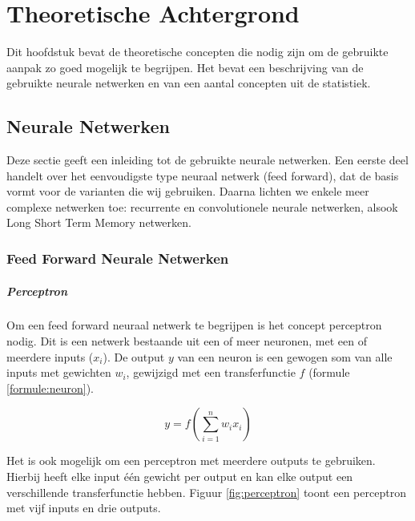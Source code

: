 \chapter{Theoretische Achtergrond}
\label{hst-theorie}
Dit hoofdstuk bevat de theoretische concepten die nodig zijn om de gebruikte aanpak zo goed mogelijk te begrijpen. Het bevat een beschrijving van de gebruikte neurale netwerken en van een aantal concepten uit de statistiek.

\section{Neurale Netwerken}
Deze sectie geeft een inleiding tot de gebruikte neurale netwerken. Een eerste deel handelt over het eenvoudigste type neuraal netwerk (feed forward), dat de basis vormt voor de varianten die wij gebruiken. Daarna lichten we enkele meer complexe netwerken toe: recurrente en convolutionele neurale netwerken, alsook Long Short Term Memory netwerken. 

\subsection{Feed Forward Neurale Netwerken}
\paragraph{Perceptron} %
\label{par:perceptron}

Om een feed forward neuraal netwerk te begrijpen is het concept perceptron nodig. Dit is een netwerk bestaande uit een of meer neuronen, met een of meerdere inputs ($x_i$). De output $y$ van een neuron is een gewogen som van alle inputs met gewichten $w_i$, gewijzigd met een transferfunctie $f$ (formule \ref{formule:neuron}).

\begin{equation}
    y = f(\sum\limits_{i=1}^{n}w_ix_i)
    \label{formule:neuron}
\end{equation}

Het is ook mogelijk om een perceptron met meerdere outputs te gebruiken. Hierbij heeft elke input \'e\'en gewicht per output en kan elke output een verschillende transferfunctie hebben. Figuur \ref{fig:perceptron} toont een perceptron met vijf inputs en drie outputs.

